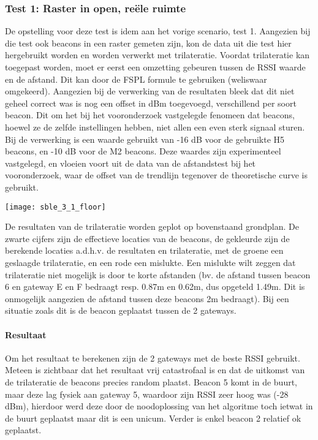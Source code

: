 \subsubsection{Test 1: Raster in open, reële ruimte}
\begin{minipage}{0.55\textwidth}
De opstelling voor deze test is idem aan het vorige scenario, test 1. Aangezien bij die test ook beacons in een raster gemeten zijn, kon de data uit die test hier hergebruikt worden en worden verwerkt met trilateratie. Voordat trilateratie kan toegepast worden, moet er eerst een omzetting gebeuren tussen de RSSI waarde en de afstand. Dit kan door de FSPL formule te gebruiken (weliswaar omgekeerd). Aangezien bij de verwerking van de resultaten bleek dat dit niet geheel correct was is nog een offset in dBm toegevoegd, verschillend per soort beacon. Dit om het bij het vooronderzoek vastgelegde fenomeen dat beacons, hoewel ze de zelfde instellingen hebben, niet allen een even sterk signaal sturen. Bij de verwerking is een waarde gebruikt van -16 dB voor de gebruikte H5 beacons, en -10 dB voor de M2 beacons. Deze waardes zijn experimenteel vastgelegd, en vloeien voort uit de data van de afstandstest bij het vooronderzoek, waar de offset van de trendlijn tegenover de theoretische curve is gebruikt.
\end{minipage}
\hfill
\begin{minipage}{0.42\textwidth}
	\texttt{[image: sble\_3\_1\_floor]}
	\label{fig:ond-ble-static-3-1}
\end{minipage}

De resultaten van de trilateratie worden geplot op bovenstaand grondplan. De zwarte cijfers zijn de effectieve locaties van de beacons, de gekleurde zijn de berekende locaties a.d.h.v. de resultaten en trilateratie, met de groene een geslaagde trilateratie, en een rode een mislukte. Een mislukte wilt zeggen dat trilateratie niet mogelijk is door te korte afstanden (bv. de afstand tussen beacon 6 en gateway E en F bedraagt resp. 0.87m en 0.62m, dus opgeteld 1.49m. Dit is onmogelijk aangezien de afstand tussen deze beacons 2m bedraagt). Bij een situatie zoals dit is de beacon geplaatst tussen de 2 gateways.

\paragraph{Resultaat}
Om het resultaat te berekenen zijn de 2 gateways met de beste RSSI gebruikt. Meteen is zichtbaar dat het resultaat vrij catastrofaal is en dat de uitkomst van de trilateratie de beacons precies random plaatst. Beacon 5 komt in de buurt, maar deze lag fysiek aan gateway 5, waardoor zijn RSSI zeer hoog was (-28 dBm), hierdoor werd deze door de noodoplossing van het algoritme toch ietwat in de buurt geplaatst maar dit is een unicum. Verder is enkel beacon 2 relatief ok geplaatst.

